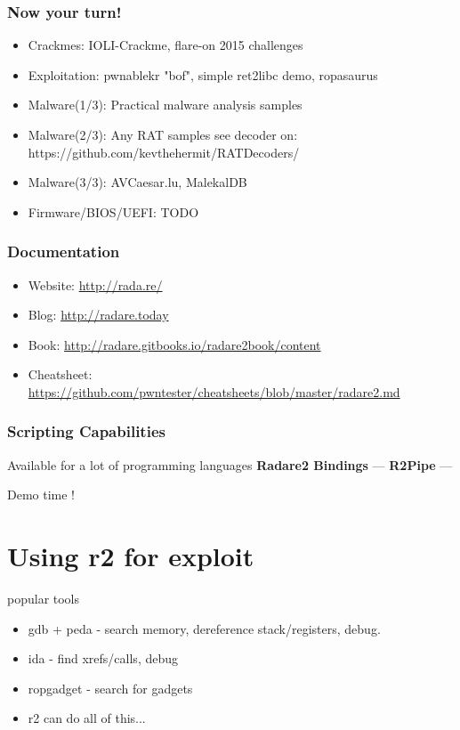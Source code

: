 \documentclass[10pt,pdf,utf8,english,compress,hyperref={unicode}]{beamer}
\begin{document}
\begin{frame}[fragile]
  \frametitle{Now your turn!}
    \begin{itemize}
    \item \alert{Crackmes:} IOLI-Crackme, flare-on 2015 challenges
    \item \alert{Exploitation:} pwnablekr "bof", simple ret2libc demo, ropasaurus
    \item \alert{Malware(1/3):} Practical malware analysis samples
    \item \alert{Malware(2/3):} Any RAT samples see decoder on: https://github.com/kevthehermit/RATDecoders/
    \item \alert{Malware(3/3):} AVCaesar.lu, MalekalDB
    \item \alert{Firmware/BIOS/UEFI:} TODO
    \end{itemize}
\end{frame}

\begin{frame}[fragile]
  \frametitle{Documentation}
    \begin{itemize}
    \item \alert{Website:} {\url{http://rada.re/}}
    \item \alert{Blog:} {\url{http://radare.today}}
    \item \alert{Book:} {\url{http://radare.gitbooks.io/radare2book/content}}
	\item \alert{Cheatsheet:} {\url{https://github.com/pwntester/cheatsheets/blob/master/radare2.md}}
    \end{itemize}
\end{frame}

\begin{frame}[fragile]
  \frametitle{Scripting Capabilities}
  \center Available for a lot of programming languages
  \center\textbf{Radare2 Bindings} —
  \center\textbf{R2Pipe} —
  \noindent\makebox[\linewidth]{\rule{\paperwidth}{0.4pt}}
  \item Demo time !
\end{frame}

\section{Using r2 for exploit}
\begin{frame}{popular tools}
	\begin{itemize}
		\item gdb + peda - search memory, dereference stack/registers, debug.
		\item ida - find xrefs/calls, debug
		\item ropgadget - search for gadgets
		\item r2 can do all of this...
	\end{itemize}
\end{frame}
\end{document}
